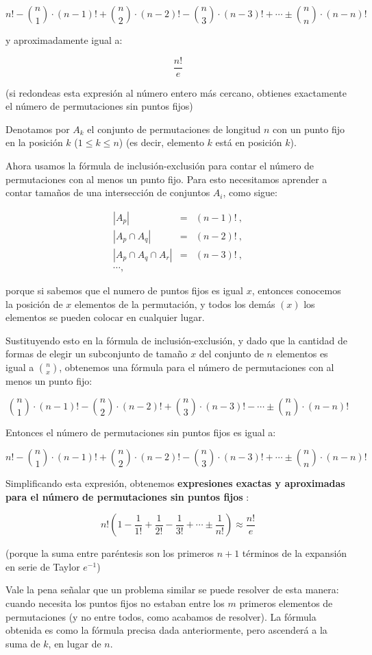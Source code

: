 $$n! - \binom{n}{1} \cdot (n-1)! + \binom{n}{2} \cdot (n-2)! - \binom{n}{3} \cdot (n-3)! + \cdots \pm \binom{n}{n} \cdot (n-n)!$$

y aproximadamente igual a:

$$\frac{ n! }{ e }$$

(si redondeas esta expresión al número entero más cercano, obtienes exactamente el número de permutaciones sin puntos fijos)

Denotamos por $A_k$ el conjunto de permutaciones de longitud $n$ con un punto fijo en la posición $k$ ($1 \le k \le n$) (es decir, elemento $k$ está en posición $k$).

Ahora usamos la fórmula de inclusión-exclusión para contar el número de permutaciones con al menos un punto fijo. Para esto necesitamos aprender a contar tamaños de una intersección de conjuntos $A_i$, como sigue:

\begin{eqnarray}
   \left| A_p \right| &=& (n-1)!\ , \\ 
   \left| A_p \cap A_q \right| &=& (n-2)!\ , \\ 
   \left| A_p \cap A_q \cap A_r \right| &=& (n-3)!\ , \\ 
   \cdots , 
\end{eqnarray}



porque si sabemos que el numero de puntos fijos es igual $x$, entonces conocemos la posición de $x$ elementos de la permutación, y todos los demás $(x)$ los elementos se pueden colocar en cualquier lugar.

Sustituyendo esto en la fórmula de inclusión-exclusión, y dado que la cantidad de formas de elegir un 
subconjunto de tamaño $x$ del conjunto de $n$ elementos es igual a $\binom{n}{x}$, obtenemos una 
fórmula para el número de permutaciones con al menos un punto fijo:

$$\binom{n}{1} \cdot (n-1)! - \binom{n}{2} \cdot (n-2)! + \binom{n}{3} \cdot (n-3)! - \cdots \pm \binom{n}{n} \cdot (n-n)!$$

Entonces el número de permutaciones sin puntos fijos es igual a:

$$n! - \binom{n}{1} \cdot (n-1)! + \binom{n}{2} \cdot (n-2)! - \binom{n}{3} \cdot (n-3)! + \cdots \pm \binom{n}{n} \cdot (n-n)!$$

Simplificando esta expresión, obtenemos \textbf{expresiones exactas y aproximadas para el número de permutaciones sin puntos fijos} :

$$n! \left( 1 - \frac{1}{1!} + \frac{1}{2!} - \frac{1}{3!} + \cdots \pm \frac{1}{n!} \right ) \approx \frac{n!}{e}$$

(porque la suma entre paréntesis son los primeros $n+1$ términos de la expansión en serie de Taylor $e^{-1}$)

Vale la pena señalar que un problema similar se puede resolver de esta manera: cuando necesita los 
puntos fijos no estaban entre los $m$ primeros elementos de permutaciones (y no entre todos, como 
acabamos de resolver). La fórmula obtenida es como la fórmula precisa dada anteriormente, pero 
ascenderá a la suma de $k$, en lugar de $n$.
